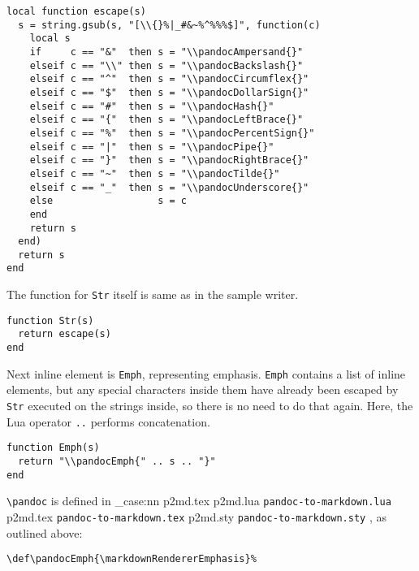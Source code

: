 \documentclass[
  digital,     %
  oneside,     %
  nosansbold,  %
  nocolorbold, %
  lof,         %
  nolot,       %
]{fithesis4}
\newcommand\macro[1]{\texttt{\textbackslash{}{#1}}}
\newcommand\pandoc[1]{\macro{pandoc\-{#1}}}
\newcommand\file[1]
  {
    \str_case:nn
      { #1 }
      {
        { p2md.lua } { \texttt{pandoc\hyp{}to\hyp{}markdown.lua} }
        { p2md.tex } { \texttt{pandoc\hyp{}to\hyp{}markdown.tex} }
        { p2md.sty } { \texttt{pandoc\hyp{}to\hyp{}markdown.sty} }
      }
  }
\begin{document}
\noindent
\lstset{language=[5.3]Lua}
\begin{lstlisting}
local function escape(s)
  s = string.gsub(s, "[\\{}%|_#&~%^%%%$]", function(c)
    local s
    if     c == "&"  then s = "\\pandocAmpersand{}"
    elseif c == "\\" then s = "\\pandocBackslash{}"
    elseif c == "^"  then s = "\\pandocCircumflex{}"
    elseif c == "$"  then s = "\\pandocDollarSign{}"
    elseif c == "#"  then s = "\\pandocHash{}"
    elseif c == "{"  then s = "\\pandocLeftBrace{}"
    elseif c == "%"  then s = "\\pandocPercentSign{}"
    elseif c == "|"  then s = "\\pandocPipe{}"
    elseif c == "}"  then s = "\\pandocRightBrace{}"
    elseif c == "~"  then s = "\\pandocTilde{}"
    elseif c == "_"  then s = "\\pandocUnderscore{}"
    else                  s = c
    end
    return s
  end)
  return s
end
\end{lstlisting}

\noindent
The function for \texttt{Str} itself is same as in the sample writer.

\noindent
\lstset{language=[5.3]Lua}
\begin{lstlisting}
function Str(s)
  return escape(s)
end
\end{lstlisting}

\noindent
Next inline element is \texttt{Emph}, representing emphasis. \texttt{Emph} contains a list of inline elements, but any special characters inside them have already been escaped by \texttt{Str} executed on the strings inside, so there is no need to do that again. Here, the Lua operator \texttt{..} performs concatenation.

\noindent
\lstset{language=[5.3]Lua}
\begin{lstlisting}
function Emph(s)
  return "\\pandocEmph{" .. s .. "}"
end
\end{lstlisting}

\noindent
\pandoc{Emph} is defined in \file{p2md.tex}, as outlined above:

\noindent
\lstset{language=[plain]TeX}
\begin{lstlisting}
\def\pandocEmph{\markdownRendererEmphasis}%
\end{lstlisting}
\end{document}

